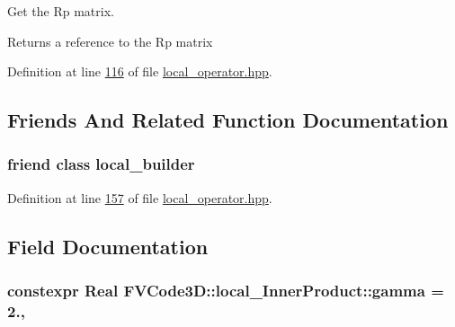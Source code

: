Get the Rp matrix. 

\begin{DoxyReturn}{Returns}
a reference to the Rp matrix 
\end{DoxyReturn}


Definition at line \hyperlink{local__operator_8hpp_source_l00116}{116} of file \hyperlink{local__operator_8hpp_source}{local\+\_\+operator.\+hpp}.



\subsection{Friends And Related Function Documentation}
\subsubsection[{\texorpdfstring{local\+\_\+builder}{local_builder}}]{\setlength{\rightskip}{0pt plus 5cm}friend class {\bf local\+\_\+builder}\hspace{0.3cm}{\ttfamily [friend]}}\hypertarget{classFVCode3D_1_1local__InnerProduct_abcd35ed5f4c4c65e5aee0132d25150ff}{}\label{classFVCode3D_1_1local__InnerProduct_abcd35ed5f4c4c65e5aee0132d25150ff}


Definition at line \hyperlink{local__operator_8hpp_source_l00157}{157} of file \hyperlink{local__operator_8hpp_source}{local\+\_\+operator.\+hpp}.



\subsection{Field Documentation}
\subsubsection[{\texorpdfstring{gamma}{gamma}}]{\setlength{\rightskip}{0pt plus 5cm}constexpr {\bf Real} F\+V\+Code3\+D\+::local\+\_\+\+Inner\+Product\+::gamma = 2.\hspace{0.3cm}{\ttfamily [static]}, {\ttfamily [private]}}\hypertarget{classFVCode3D_1_1local__InnerProduct_af7c3e141a73231635abf5fdb7fe65fae}{}\label{classFVCode3D_1_1local__InnerProduct_af7c3e141a73231635abf5fdb7fe65fae}


